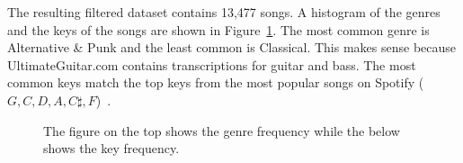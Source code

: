 \documentclass[letterpaper]{article}
\begin{document}
The resulting filtered dataset contains 13,477 songs. A histogram of the genres and the keys of the songs are shown in Figure~\ref{data}. The most common genre is Alternative \& Punk and the least common is Classical. This makes sense because UltimateGuitar.com contains transcriptions for guitar and bass. The most common keys match the top keys from the most popular songs on Spotify ($G, C, D, A, C\sharp, F$)~\cite{spotify}.

\begin{figure}[t]
	\centering
	\label{during}
	\caption{The figure on the top shows the genre frequency while the below shows the key frequency.}
	\label{data} 
\end{figure} 
\end{document}
